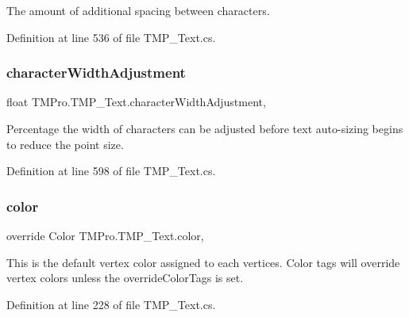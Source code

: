 The amount of additional spacing between characters. 

Definition at line 536 of file T\+M\+P\+\_\+\+Text.\+cs.

\mbox{\label{class_t_m_pro_1_1_t_m_p___text_a14f597328c87f7682183dfd25b0998ba}} 
\subsubsection{\texorpdfstring{characterWidthAdjustment}{characterWidthAdjustment}}
{\footnotesize\ttfamily float T\+M\+Pro.\+T\+M\+P\+\_\+\+Text.\+character\+Width\+Adjustment\hspace{0.3cm}{\ttfamily [get]}, {\ttfamily [set]}}



Percentage the width of characters can be adjusted before text auto-\/sizing begins to reduce the point size. 



Definition at line 598 of file T\+M\+P\+\_\+\+Text.\+cs.

\mbox{\label{class_t_m_pro_1_1_t_m_p___text_af874b3b1f2d1565c68e0c3ad9f79e5c4}} 
\subsubsection{\texorpdfstring{color}{color}}
{\footnotesize\ttfamily override Color T\+M\+Pro.\+T\+M\+P\+\_\+\+Text.\+color\hspace{0.3cm}{\ttfamily [get]}, {\ttfamily [set]}}



This is the default vertex color assigned to each vertices. Color tags will override vertex colors unless the override\+Color\+Tags is set. 



Definition at line 228 of file T\+M\+P\+\_\+\+Text.\+cs.

\mbox{\label{class_t_m_pro_1_1_t_m_p___text_a9e388e5afbcba8e72a65cd00ca7001b4}} 
